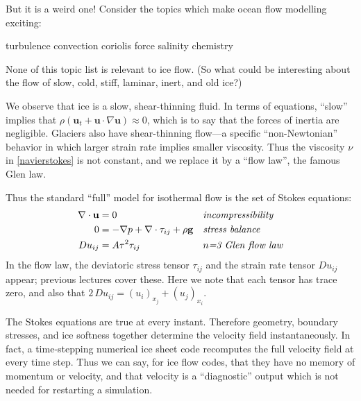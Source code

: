 \documentclass[titlepage,letterpaper,final,12pt]{scrartcl}
\begin{document}
But it is a weird one!  Consider the topics which make ocean flow modelling exciting:
  \begin{center} turbulence \qquad convection \qquad  coriolis force  \qquad salinity \qquad chemistry
  \end{center}
None of this topic list is relevant to ice flow.  (So what could be interesting about the flow of slow, cold, stiff, laminar, inert, and old ice?)

We observe that ice is a slow, shear-thinning fluid.  In terms of equations, ``slow'' implies that $\rho \left(\mathbf{u}_t + \mathbf{u}\cdot\nabla \mathbf{u}\right) \approx 0$, which is to say that the forces of inertia are negligible.  Glaciers also have shear-thinning flow---a specific ``non-Newtonian'' behavior in which larger strain rate implies smaller viscosity.  Thus the viscosity $\nu$ in \eqref{navierstokes} is not constant, and we replace it by a ``flow law'', the famous Glen law.

Thus the standard ``full'' model for isothermal flow is the set of Stokes equations:
\begin{align}
\nabla \cdot \mathbf{u} &= 0 &&\text{\emph{incompressibility}} \label{incompressibleagain} \\
0 &= - \nabla p + \nabla \cdot \tau_{ij} + \rho \mathbf{g} &&\text{\emph{stress balance}} \label{forcebalance} \\
Du_{ij} &= A \tau^2 \tau_{ij} &&\text{\emph{$n$=3 Glen flow law}} \label{flowlaw}
\end{align}
In the flow law, the deviatoric stress tensor $\tau_{ij}$ and the strain rate tensor $Du_{ij}$ appear; previous lectures cover these.  Here we note that each tensor has trace zero, and also that $2\,Du_{ij} = (u_i)_{x_j}+(u_j)_{x_i}$.

The Stokes equations are true at every instant.  Therefore geometry, boundary stresses, and ice softness together determine the velocity field instantaneously.  In fact, a time-stepping numerical ice sheet code recomputes the full velocity field at every time step.  Thus we can say, for ice flow codes, that they have no memory of momentum or velocity, and that velocity is a ``diagnostic'' output which is not needed for restarting a simulation.
\end{document}
